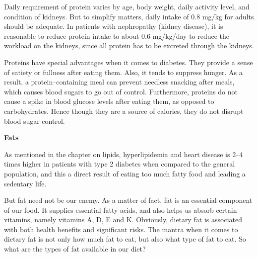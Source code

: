 Daily requirement of protein varies by age, body weight, daily activity level, and condition of kidneys. But to simplify matters, daily intake of 0.8 mg/kg for adults should be adequate. In patients with nephropathy (kidney disease), it is reasonable to reduce protein intake to about 0.6 mg/kg/day to reduce the workload on the kidneys, since all protein has to be excreted through the kidneys.

Proteins have special advantages when it comes to diabetes. They provide a sense of satiety or fullness after eating them. Also, it tends to suppress hunger. As a result, a protein–containing meal can prevent needless snacking after meals, which causes blood sugars to go out of control. Furthermore, proteins do not cause a spike in blood glucose levels after eating them, as opposed to carbohydrates. Hence though they are a source of calories, they do not disrupt blood sugar control.

\noindent\textbf{Fats}

As mentioned in the chapter on lipids, hyperlipidemia and heart disease is 2–4 times higher in patients with type 2 diabetes when compared to the general population, and this a direct result of eating too much fatty food and leading a sedentary life.

But fat need not be our enemy. As a matter of fact, fat is an essential component of our food. It supplies essential fatty acids, and also helps us absorb certain vitamins, namely vitamins A, D, E and K. Obviously, dietary fat is associated with both health benefits and significant risks. The mantra when it comes to dietary fat is not only how much fat to eat, but also what type of fat to eat. So what are the types of fat available in our diet?

